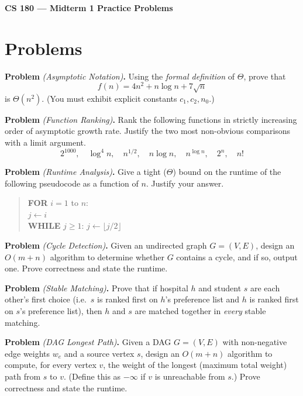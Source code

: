 \documentclass[10pt]{article}
\newcounter{prob}
\newcommand{\problem}[2]{%
  \stepcounter{prob}%
  \medskip\noindent\textbf{Problem \theprob} \textit{(#1)}\textbf{.} #2\par\smallskip
}
\begin{document}
\begin{center}
  {\Large\bfseries CS 180 --- Midterm 1 Practice Problems}
\end{center}

\section*{Problems}

\setcounter{prob}{1}

\problem{Asymptotic Notation}{
Using the \emph{formal definition} of $\Theta$, prove that
$$f(n) = 4n^2 + n\log n + 7\sqrt{n}$$
is $\Theta(n^2)$. (You must exhibit explicit constants $c_1, c_2, n_0$.)
}

\problem{Function Ranking}{
Rank the following functions in strictly increasing order of asymptotic growth rate. Justify the two most non-obvious comparisons with a limit argument.
$$2^{1000}, \quad \log^4 n, \quad n^{1/2}, \quad n\log n, \quad n^{\log n}, \quad 2^n, \quad n!$$
}

\problem{Runtime Analysis}{
Give a tight ($\Theta$) bound on the runtime of the following pseudocode as a function of $n$. Justify your answer.
\begin{quote}
\textbf{FOR} $i = 1$ to $n$:\\
\hspace*{16pt}$j \leftarrow i$\\
\hspace*{16pt}\textbf{WHILE} $j \ge 1$: \quad $j \leftarrow \lfloor j/2 \rfloor$
\end{quote}
}

\problem{Cycle Detection}{
Given an undirected graph $G = (V, E)$, design an $O(m+n)$ algorithm to determine whether $G$ contains a cycle, and if so, output one. Prove correctness and state the runtime.
}

\problem{Stable Matching}{
Prove that if hospital $h$ and student $s$ are each other's first choice (i.e.\ $s$ is ranked first on $h$'s preference list and $h$ is ranked first on $s$'s preference list), then $h$ and $s$ are matched together in \emph{every} stable matching.
}

\problem{DAG Longest Path}{
Given a DAG $G = (V, E)$ with non-negative edge weights $w_e$ and a source vertex $s$, design an $O(m+n)$ algorithm to compute, for every vertex $v$, the weight of the longest (maximum total weight) path from $s$ to $v$. (Define this as $-\infty$ if $v$ is unreachable from $s$.) Prove correctness and state the runtime.
}
\end{document}
